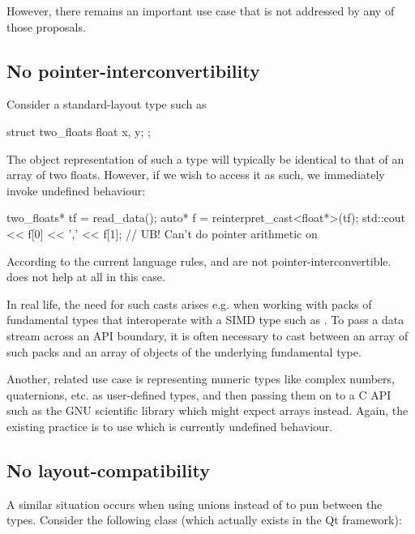 However, there remains an important use case that is not addressed by any of those proposals. 

\subsection{No pointer-interconvertibility}

Consider a standard-layout type such as

\begin{codeblock}
struct two_floats {
    float x, y;
};
\end{codeblock}

The object representation of such a type will typically be identical to that of an array of two floats. However, if we wish to access it as such, we immediately invoke undefined behaviour:

\begin{codeblock}
two_floats* tf = read_data();
auto* f = reinterpret_cast<float*>(tf);
std::cout << f[0] << ',' << f[1];   // UB! Can't do pointer arithmetic on 
\end{codeblock}

According to the current language rules,  and  are not pointer-interconvertible.  does not help at all in this case.

In real life, the need for such casts arises e.g. when working with packs of fundamental types that interoperate with a SIMD type such as . To pass a data stream across an API boundary, it is often necessary to cast between an array of such packs and an array of objects of the underlying fundamental type.

Another, related use case is representing numeric types like complex numbers, quaternions, etc. as user-defined types, and then passing them on to a C API such as the GNU scientific library which might expect arrays instead. Again, the existing practice is to use  which is currently undefined behaviour.

\subsection{No layout-compatibility}

A similar situation occurs when using unions instead of  to pun between the types. Consider the following class (which actually exists in the Qt framework):

